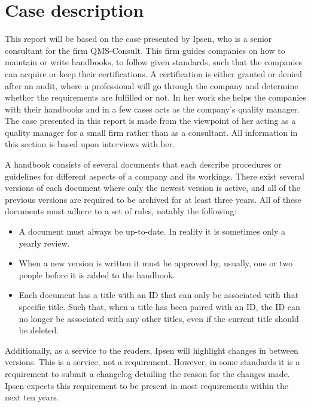 \section{Case description} \label{sec:CaseDescription}

This report will be based on the case presented by Ipsen, who is a senior consultant for the firm QMS-Consult.
This firm guides companies on how to maintain or write handbooks, to follow given standards, such that the companies can acquire or keep their certifications.
A certification is either granted or denied after an audit, where a professional will go through the company and determine whether the requirements are fulfilled or not.
In her work she helps the companies with their handbooks and in a few cases acts as the company's quality manager.
The case presented in this report is made from the viewpoint of her acting as a quality manager for a small firm rather than as a consultant.
All information in this section is based upon interviews with her.

A handbook consists of several documents that each describe procedures or guidelines for different aspects of a company and its workings.
There exist several versions of each document where only the newest version is active, and all of the previous versions are required to be archived for at least three years.
All of these documents must adhere to a set of rules, notably the following:

\begin{itemize}
	\item
	A document must always be up-to-date.
	In reality it is sometimes only a yearly review.
	\item
	When a new version is written it must be approved by, usually, one or two people before it is added to the handbook.
	\item
	Each document has a title with an ID that can only be associated with that specific title.
	Such that, when a title has been paired with an ID, the ID can no longer be associated with any other titles, even if the current title should be deleted.
\end{itemize}

Additionally, as a service to the readers, Ipsen will highlight changes in between versions.
This is a service, not a requirement.
However, in some standards it is a requirement to submit a changelog detailing the reason for the changes made.
Ipsen expects this requirement to be present in most requirements within the next ten years.

